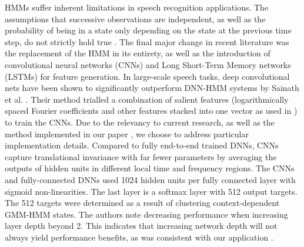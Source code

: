 \documentclass[12pt]{llncs}
\newcommand{\ikN}[1]{\todo[inline, size=\small, color=orange!30]{[ik] #1}}
\begin{document}





HMMs suffer inherent limitations in speech recognition applications. The assumptions that successive observations are independent, as well as the probability of being in a state only depending on the state at the previous time step, do not strictly hold true \cite{rabiner1989tutorial}. The final major change in recent literature was the replacement of the HMM in its entirety, as well as the introduction of convolutional neural networks (CNNs) and Long Short-Term Memory networks (LSTMs) for feature generation. In large-scale speech tasks, deep convolutional nets have been shown to significantly outperform DNN-HMM systems by Sainath et al. \cite{sainath2015deep}. Their method trialled a combination of salient features (logarithmically spaced Fourier coefficients and other features stacked into one vector as used in \cite{soltau2010ibm}) to train the CNNs. Due to the relevancy to current research, as well as the method implemented in our paper \cite{kiskin2017mosquito}, we choose to address particular implementation details. Compared to fully end-to-end trained DNNs, CNNs capture translational invariance with far fewer parameters by averaging the outputs of hidden units in different local time and frequency regions. The CNNs and fully-connected DNNs used 1024 hidden units per fully connected layer with sigmoid non-linearities. The last layer is a softmax layer with 512 output targets. The 512 targets were determined as a result of clustering context-dependent GMM-HMM states. The authors note decreasing performance when increasing layer depth beyond 2. This indicates that increasing network depth will not always yield performance benefits, as was consistent with our application \cite[Section 3.2]{kiskin2017mosquito}.
	
 
\end{document}
